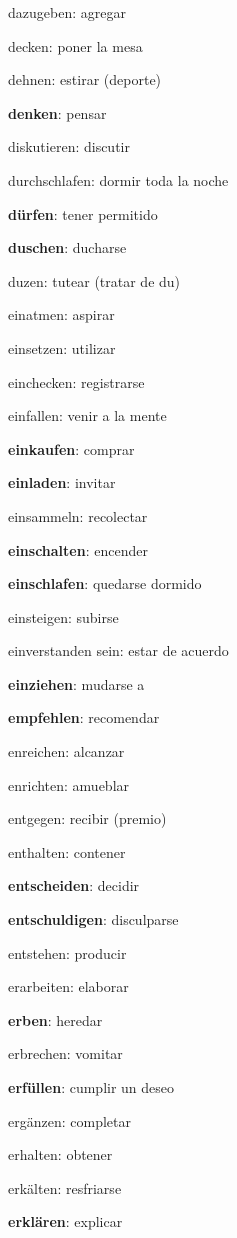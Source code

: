 \begin{multicols}{2}
\begin{myitemize}
\item dazugeben: agregar
\item decken: poner la mesa
\item dehnen: estirar (deporte)
\item \textbf{denken}: pensar
\item diskutieren: discutir
\item durchschlafen: dormir toda la noche
\item \textbf{dürfen}: tener permitido
\item \textbf{duschen}: ducharse
\item duzen: tutear (tratar de du)
\item einatmen: aspirar
\item einsetzen: utilizar
\item einchecken: registrarse
\item einfallen: venir a la mente
\item \textbf{einkaufen}: comprar
\item \textbf{einladen}: invitar
\item einsammeln: recolectar
\item \textbf{einschalten}: encender
\item \textbf{einschlafen}: quedarse dormido
\item einsteigen: subirse
\item einverstanden sein: estar de acuerdo
\item \textbf{einziehen}: mudarse a
\item \textbf{empfehlen}: recomendar
\item enreichen: alcanzar
\item enrichten: amueblar
\item entgegen: recibir (premio)
\item enthalten: contener
\item \textbf{entscheiden}: decidir
\item \textbf{entschuldigen}: disculparse
\item entstehen: producir
\item erarbeiten: elaborar
\item \textbf{erben}: heredar
\item erbrechen: vomitar
\item \textbf{erfüllen}: cumplir un deseo
\item ergänzen: completar
\item erhalten: obtener
\item erkälten: resfriarse
\item \textbf{erklären}: explicar

\end{myitemize}
\end{multicols}
